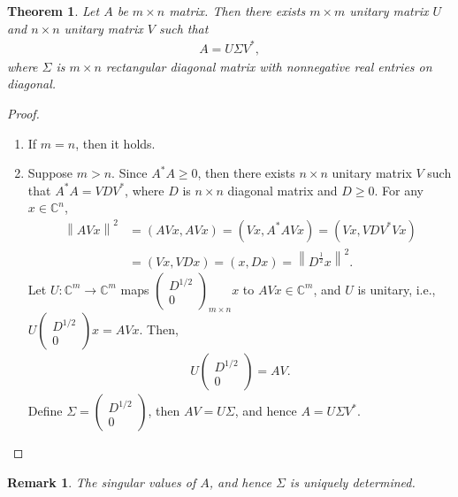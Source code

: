 \documentclass[11pt]{book}
\newtheorem{theorem}{Theorem}[chapter]
\newtheorem{remark}{Remark}[chapter]
\theoremstyle{definition}
\numberwithin{equation}{chapter}
\begin{document}
\begin{theorem}
Let $A$ be $m\times n$ matrix. Then there exists $m \times m$ unitary matrix $U$ and $n \times n$ unitary matrix $V$ such that
\begin{align*}
    A = U \Sigma V^*,
\end{align*}
where $\Sigma$ is $m \times n$ rectangular diagonal matrix with nonnegative real entries on diagonal.
\end{theorem}
\begin{proof}
~\begin{enumerate}[label=(\alph*)]
    \item If $m = n$, then it holds.
    
    \item Suppose $m > n$. Since $A^*A \geq 0$, then there exists $n \times n$ unitary matrix $V$ such that $A^*A = V D V^*$, where $D$ is $n \times n$ diagonal matrix and $D \geq 0$. For any $x \in \mathbb{C}^n$, 
    \begin{align*}
        \left\|AV x\right\|^2 & = (AVx, AVx) = (Vx, A^*AV x) = (Vx, V D V^* V x) \\
        & = (Vx, VDx) = (x, Dx) = \left\|D^{\frac{1}{2}} x\right\|^2.
    \end{align*}
    Let $U: \mathbb{C}^m \to \mathbb{C}^m$ maps $\begin{pmatrix}
        D^{1/2} \\
        0
    \end{pmatrix}_{m\times n}x$ to $AVx \in \mathbb{C}^m$, and $U$ is unitary, i.e., $U \begin{pmatrix} D^{1/2} \\ 0 \end{pmatrix}x = AVx$. Then, 
    \begin{align*}
        U \begin{pmatrix} D^{1/2} \\ 0 \end{pmatrix} = AV.
    \end{align*}
    Define $\Sigma = \begin{pmatrix} D^{1/2} \\ 0 \end{pmatrix}$, then $AV = U\Sigma$, and hence $A = U\Sigma V^*$.
\end{enumerate}
\end{proof}

\begin{remark}
The singular values of $A$, and hence $\Sigma$ is uniquely determined. 
\end{remark}
\end{document}
